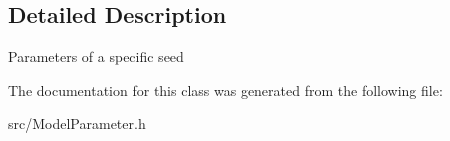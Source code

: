 \subsection{Detailed Description}
Parameters of a specific seed 

The documentation for this class was generated from the following file\+:\begin{DoxyCompactItemize}
\item 
src/Model\+Parameter.\+h\end{DoxyCompactItemize}
